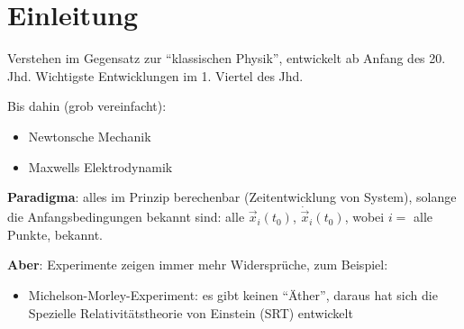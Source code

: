 \section{Einleitung}

Verstehen im Gegensatz zur "`klassischen Physik"', entwickelt ab Anfang des 20. Jhd. Wichtigste Entwicklungen im 1. Viertel des Jhd.

Bis dahin (grob vereinfacht):
\begin{itemize}
	\item Newtonsche Mechanik
	\item Maxwells Elektrodynamik
\end{itemize}

\textbf{Paradigma}: alles im Prinzip berechenbar (Zeitentwicklung von System), solange die Anfangsbedingungen bekannt sind: alle $\vec{x}_i(t_0)$, $\dot{\vec{x}}_i(t_0)$, wobei $i =$ alle Punkte, bekannt.

\textbf{Aber}: Experimente zeigen immer mehr Widersprüche, zum Beispiel:
\begin{itemize}
	\item Michelson-Morley-Experiment: es gibt keinen "`Äther"', daraus hat sich die Spezielle Relativitätstheorie von Einstein (SRT) entwickelt
\end{itemize}